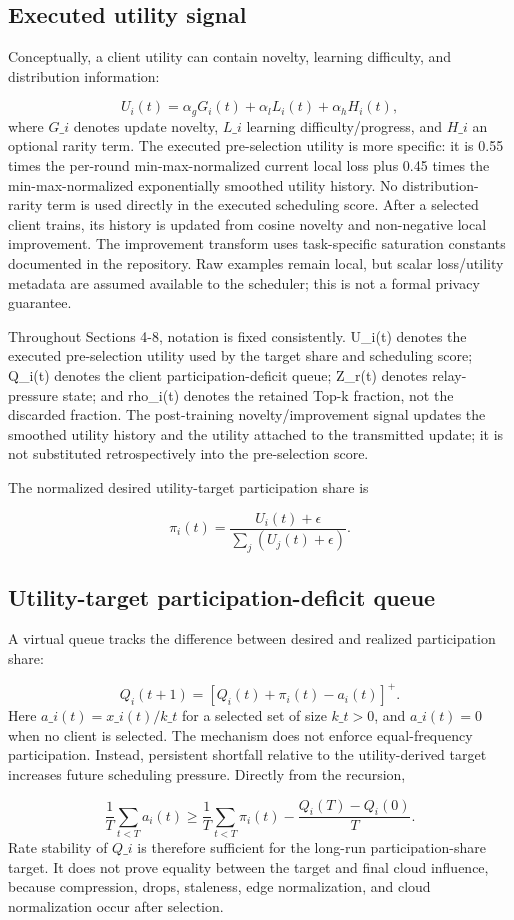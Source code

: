 \documentclass[11pt]{article}
\begin{document}
\subsection*{Executed utility signal}
Conceptually, a client utility can contain novelty, learning difficulty, and distribution information:\par
\[
U_i(t)=\alpha_gG_i(t)+\alpha_lL_i(t)+\alpha_hH_i(t),
\]
where \(G\_i\) denotes update novelty, \(L\_i\) learning difficulty/progress, and \(H\_i\) an optional rarity term. The executed pre-selection utility is more specific: it is 0.55 times the per-round min-max-normalized current local loss plus 0.45 times the min-max-normalized exponentially smoothed utility history. No distribution-rarity term is used directly in the executed scheduling score. After a selected client trains, its history is updated from cosine novelty and non-negative local improvement. The improvement transform uses task-specific saturation constants documented in the repository. Raw examples remain local, but scalar loss/utility metadata are assumed available to the scheduler; this is not a formal privacy guarantee.\par
Throughout Sections 4-8, notation is fixed consistently. U\_i(t) denotes the executed pre-selection utility used by the target share and scheduling score; Q\_i(t) denotes the client participation-deficit queue; Z\_r(t) denotes relay-pressure state; and rho\_i(t) denotes the retained Top-k fraction, not the discarded fraction. The post-training novelty/improvement signal updates the smoothed utility history and the utility attached to the transmitted update; it is not substituted retrospectively into the pre-selection score.\par
The normalized desired utility-target participation share is\par
\[
\pi_i(t)=\frac{U_i(t)+\epsilon}{\sum_j(U_j(t)+\epsilon)}.
\]
\subsection*{Utility-target participation-deficit queue}
A virtual queue tracks the difference between desired and realized participation share:\par
\[
Q_i(t+1)=\left[Q_i(t)+\pi_i(t)-a_i(t)\right]^+.
\]
Here \(a\_i(t)=x\_i(t)/k\_t\) for a selected set of size \(k\_t>0\), and \(a\_i(t)=0\) when no client is selected. The mechanism does not enforce equal-frequency participation. Instead, persistent shortfall relative to the utility-derived target increases future scheduling pressure. Directly from the recursion,\par
\[
\frac1T\sum_{t<T}a_i(t) \ge \frac1T\sum_{t<T}\pi_i(t) - \frac{Q_i(T)-Q_i(0)}{T}.
\]
Rate stability of \(Q\_i\) is therefore sufficient for the long-run participation-share target. It does not prove equality between the target and final cloud influence, because compression, drops, staleness, edge normalization, and cloud normalization occur after selection.\par
\end{document}

